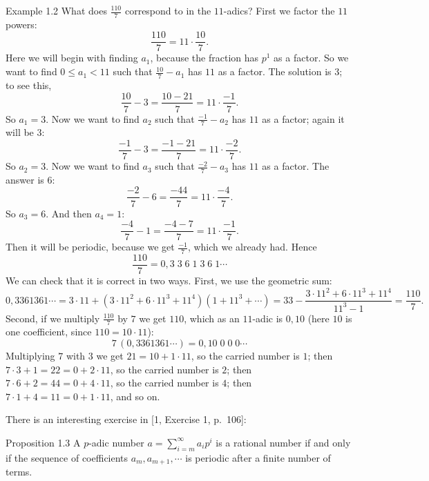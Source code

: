 \documentclass[11pt]{article}
\begin{document}
\begin{exbox}{Example 1.2}
What does $\frac{110}{7}$ correspond to in the $11$-adics? First we factor the $11$ powers:
\[
\frac{110}{7} = 11 \cdot \frac{10}{7}.
\]
Here we will begin with finding $a_1$, because the fraction has $p^1$ as a factor. So we want to find $0 \leq a_1 < 11$ such that $\frac{10}{7} - a_1$ has $11$ as a factor. The solution is $3$; to see this,
\[
\frac{10}{7} - 3 = \frac{10-21}{7} = 11\cdot \frac{-1}{7}.
\]
So $a_1 = 3$. Now we want to find $a_2$ such that $\frac{-1}{7} - a_2$ has $11$ as a factor; again it will be $3$:
\[
\frac{-1}{7} - 3 = \frac{-1-21}{7} = 11 \cdot \frac{-2}{7}.
\]
So $a_2 = 3$. Now we want to find $a_3$ such that $\frac{-2}{7} - a_3$ has $11$ as a factor. The answer is $6$:
\[
\frac{-2}{7} - 6 = \frac{-44}{7} = 11 \cdot \frac{-4}{7}.
\]
So $a_3 = 6$. And then $a_4 = 1$:
\[
\frac{-4}{7} - 1 = \frac{-4-7}{7} = 11 \cdot \frac{-1}{7}.
\]
Then it will be periodic, because we get $\frac{-1}{7}$, which we already had. Hence
\[
\frac{110}{7} = 0,3\; 3\; 6\; 1\; 3\; 6\; 1 \cdots
\]
We can check that it is correct in two ways. First, we use the geometric sum:
\[
0,3361361\cdots = 3\cdot 11 + (3\cdot 11^2 + 6\cdot 11^3 + 11^4)(1 + 11^3 + \cdots) = 33 - \frac{3\cdot 11^2 + 6\cdot 11^3 + 11^4}{11^3 - 1} = \frac{110}{7}.
\]
Second, if we multiply $\frac{110}{7}$ by $7$ we get $110$, which as an $11$-adic is $0,10$ (here $10$ is one coefficient, since $110 = 10\cdot 11$):
\[
7\,(0,3361361\cdots) = 0,10\; 0\; 0\; 0 \cdots
\]
Multiplying $7$ with $3$ we get $21 = 10 + 1\cdot 11$, so the carried number is $1$; then $7\cdot 3 + 1 = 22 = 0 + 2\cdot 11$, so the carried number is $2$; then $7\cdot 6 + 2 = 44 = 0 + 4\cdot 11$, so the carried number is $4$; then $7\cdot 1 + 4 = 11 = 0 + 1\cdot 11$, and so on.
\end{exbox}

There is an interesting exercise in [1, Exercise 1, p.~106]:

\begin{thmbox}{Proposition 1.3}
A $p$-adic number $a = \sum_{i=m}^\infty a_i p^i$ is a rational number if and only if the sequence of coefficients $a_m, a_{m+1}, \cdots$ is periodic after a finite number of terms.
\end{thmbox}
\end{document}
